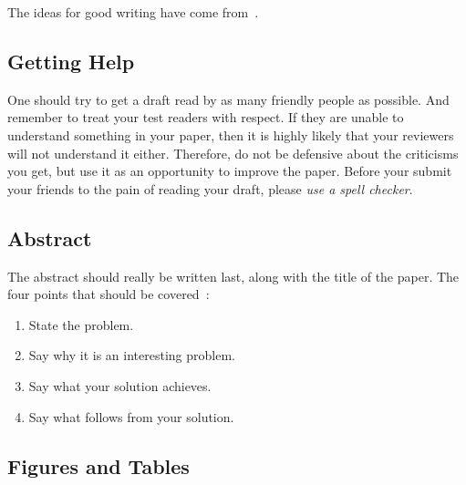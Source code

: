 \documentclass[10pt,conference,compsocconf]{IEEEtran}
\begin{document}
The ideas for good writing have come
from~\cite{editor10,jones08,anderson04}.

\subsection{Getting Help}
One should try to get a draft read by as many friendly people as
possible. And remember to treat your test readers with respect. If
they are unable to understand something in your paper, then it is
highly likely that your reviewers will not understand it
either. Therefore, do not be defensive about the criticisms you get,
but use it as an opportunity to improve the paper. Before your submit
your friends to the pain of reading your draft, please \emph{use a
  spell checker}.

\subsection{Abstract}
The abstract should really be written last, along with the title of
the paper. The four points that should be covered~\cite{jones08}:
\begin{enumerate}
\item State the problem.
\item Say why it is an interesting problem.
\item Say what your solution achieves.
\item Say what follows from your solution.
\end{enumerate}

\subsection{Figures and Tables}
\end{document}
